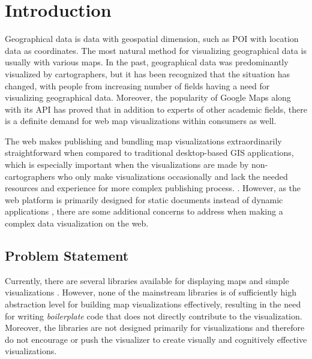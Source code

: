 
\chapter{Introduction}
\label{chapter:intro}



Geographical data is data with geospatial dimension, such as POI with location data as coordinates. The most natural method for visualizing geographical data is usually with various maps. In the past, geographical data was predominantly visualized by cartographers, but it has been recognized \citep{kraak_visualization_1999} that the situation has changed, with people from increasing number of fields having a need for visualizing geographical data. Moreover, the popularity of Google Maps \citep{google_maps_2005-1} along with its API \citep{google_maps_2005} has proved that in addition to experts of other academic fields, there is a definite demand for web map visualizations within consumers as well. 

The web makes publishing and bundling map visualizations extraordinarily straightforward when compared to traditional desktop-based GIS applications, which is especially important when the visualizations are made by non-cartographers who only make visualizations occasionally and lack the needed resources and experience for more complex publishing process. . However, as the web platform is primarily designed for static documents instead of dynamic applications \citep{berners-lee_information_1989,berners-lee_world-wide_1992}, there are some additional concerns to address when making a complex data visualization on the web.



\section{Problem Statement}

Currently, there are several libraries available for displaying maps and simple visualizations . However, none of the mainstream libraries is of sufficiently high abstraction level for building map visualizations effectively, resulting in the need for writing \emph{boilerplate} code that does not directly contribute to the visualization. Moreover, the libraries are not designed primarily for visualizations and therefore do not encourage or push the visualizer to create visually and cognitively effective visualizations.

